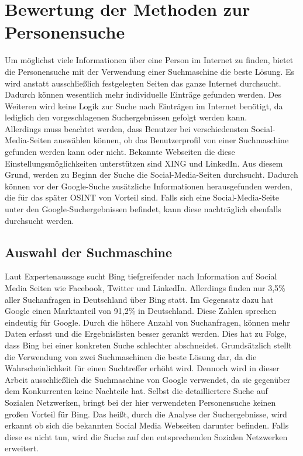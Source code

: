 \section{Bewertung der Methoden zur Personensuche}
Um möglichst viele Informationen über eine Person im Internet zu finden, bietet die Personensuche mit der Verwendung einer Suchmaschine die beste Lösung. Es wird anstatt ausschließlich festgelegten Seiten das ganze Internet durchsucht. Dadurch können wesentlich mehr individuelle Einträge gefunden werden. Des Weiteren wird keine Logik zur Suche nach Einträgen im Internet benötigt, da lediglich den vorgeschlagenen Suchergebnissen gefolgt werden kann.\\
Allerdings muss beachtet werden, dass Benutzer bei verschiedensten Social-Media-Seiten auswählen können, ob das Benutzerprofil von einer Suchmaschine gefunden werden kann oder nicht. Bekannte Webseiten die diese Einstellungsmöglichkeiten unterstützen sind XING und LinkedIn. Aus diesem Grund, werden zu Beginn der Suche die Social-Media-Seiten durchsucht. Dadurch können vor der Google-Suche zusätzliche Informationen herausgefunden werden, die für das später OSINT von Vorteil sind. Falls sich eine Social-Media-Seite unter den Google-Suchergebnissen befindet, kann diese nachträglich ebenfalls durchsucht werden.

	\subsection{Auswahl der Suchmaschine}
	Laut Expertenaussage sucht Bing tiefgreifender nach Information auf Social Media Seiten wie Facebook, Twitter und LinkedIn. Allerdings finden nur 3,5\% aller Suchanfragen in Deutschland über Bing statt. Im Gegensatz dazu hat Google einen Marktanteil von 91,2\% in Deutschland. Diese Zahlen sprechen eindeutig für Google. Durch die höhere Anzahl von Suchanfragen, können mehr Daten erfasst und die Ergebnislisten besser gerankt werden. Dies hat zu Folge, dass Bing bei einer konkreten Suche schlechter abschneidet. \cite{Suchmaschinen}
	Grundsätzlich stellt die Verwendung von zwei Suchmaschinen die beste Lösung dar, da die Wahrscheinlichkeit für einen Suchtreffer erhöht wird. Dennoch wird in dieser Arbeit ausschließlich die Suchmaschine von Google verwendet, da sie gegenüber dem Konkurrenten keine Nachteile hat. Selbst die detailliertere Suche auf Sozialen Netzwerken, bringt bei der hier verwendeten Personensuche keinen großen Vorteil für Bing. Das heißt, durch die Analyse der Suchergebnisse, wird erkannt ob sich die bekannten Social Media Webseiten darunter befinden. Falls diese es nicht tun, wird die Suche auf den entsprechenden Sozialen Netzwerken erweitert.
	 	
